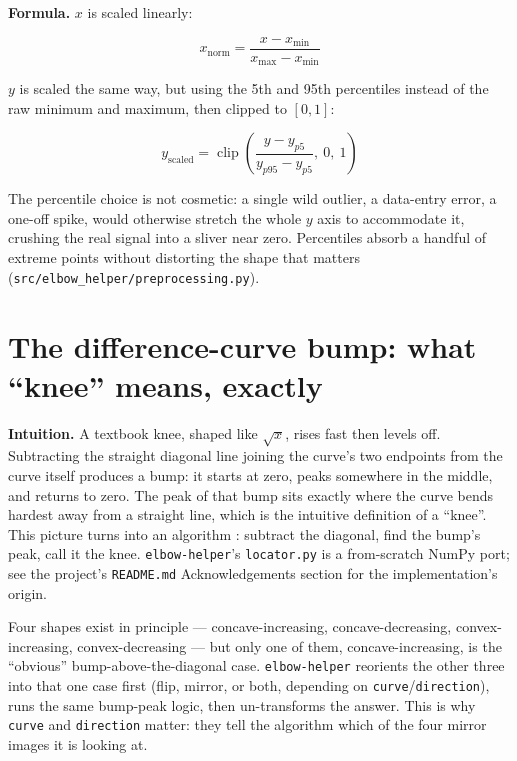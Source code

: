 \documentclass[11pt]{article}
\newcommand{\code}[1]{\texttt{#1}}
\begin{document}
\textbf{Formula.} $x$ is scaled linearly:

\begin{equation}
x_{\text{norm}} = \frac{x - x_{\min}}{x_{\max} - x_{\min}}
\end{equation}

$y$ is scaled the same way, but using the 5th and 95th percentiles instead
of the raw minimum and maximum, then clipped to $[0,1]$:

\begin{equation}
y_{\text{scaled}} = \operatorname{clip}\!\left(\frac{y - y_{p5}}{y_{p95} - y_{p5}},\ 0,\ 1\right)
\end{equation}

The percentile choice is not cosmetic: a single wild outlier, a data-entry
error, a one-off spike, would otherwise stretch the whole $y$ axis to
accommodate it, crushing the real signal into a sliver near zero.
Percentiles absorb a handful of extreme points without distorting the shape
that matters (\code{src/elbow\_helper/preprocessing.py}).

\section{The difference-curve bump: what ``knee'' means, exactly}

\textbf{Intuition.} A textbook knee, shaped like $\sqrt{x}$, rises fast then
levels off. Subtracting the straight diagonal line joining the curve's two
endpoints from the curve itself produces a bump: it starts at zero, peaks
somewhere in the middle, and returns to zero. The peak of that bump sits
exactly where the curve bends hardest away from a straight line, which is
the intuitive definition of a ``knee''. This picture turns into an algorithm
\citep{satopaa2011}: subtract the diagonal, find the bump's peak, call it the
knee. \code{elbow-helper}'s \code{locator.py} is a from-scratch NumPy port;
see the project's \code{README.md} Acknowledgements section for the
implementation's origin.

Four shapes exist in principle --- concave-increasing, concave-decreasing,
convex-increasing, convex-decreasing --- but only one of them,
concave-increasing, is the ``obvious'' bump-above-the-diagonal case.
\code{elbow-helper} reorients the other three into that one case first
(flip, mirror, or both, depending on \code{curve}/\code{direction}), runs
the same bump-peak logic, then un-transforms the answer. This is why
\code{curve} and \code{direction} matter: they tell the algorithm which of
the four mirror images it is looking at.
\end{document}
